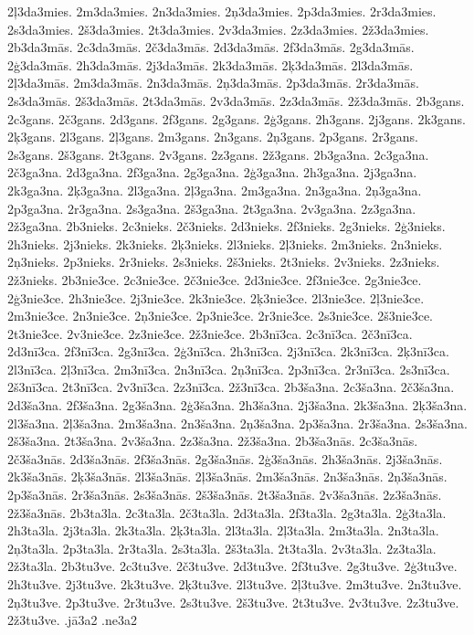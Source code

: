 {2ļ3da3mies.
2m3da3mies.
2n3da3mies.
2ņ3da3mies.
2p3da3mies.
2r3da3mies.
2s3da3mies.
2š3da3mies.
2t3da3mies.
2v3da3mies.
2z3da3mies.
2ž3da3mies.
2b3da3mās.
2c3da3mās.
2č3da3mās.
2d3da3mās.
2f3da3mās.
2g3da3mās.
2ģ3da3mās.
2h3da3mās.
2j3da3mās.
2k3da3mās.
2ķ3da3mās.
2l3da3mās.
2ļ3da3mās.
2m3da3mās.
2n3da3mās.
2ņ3da3mās.
2p3da3mās.
2r3da3mās.
2s3da3mās.
2š3da3mās.
2t3da3mās.
2v3da3mās.
2z3da3mās.
2ž3da3mās.
2b3gans.
2c3gans.
2č3gans.
2d3gans.
2f3gans.
2g3gans.
2ģ3gans.
2h3gans.
2j3gans.
2k3gans.
2ķ3gans.
2l3gans.
2ļ3gans.
2m3gans.
2n3gans.
2ņ3gans.
2p3gans.
2r3gans.
2s3gans.
2š3gans.
2t3gans.
2v3gans.
2z3gans.
2ž3gans.
2b3ga3na.
2c3ga3na.
2č3ga3na.
2d3ga3na.
2f3ga3na.
2g3ga3na.
2ģ3ga3na.
2h3ga3na.
2j3ga3na.
2k3ga3na.
2ķ3ga3na.
2l3ga3na.
2ļ3ga3na.
2m3ga3na.
2n3ga3na.
2ņ3ga3na.
2p3ga3na.
2r3ga3na.
2s3ga3na.
2š3ga3na.
2t3ga3na.
2v3ga3na.
2z3ga3na.
2ž3ga3na.
2b3nieks.
2c3nieks.
2č3nieks.
2d3nieks.
2f3nieks.
2g3nieks.
2ģ3nieks.
2h3nieks.
2j3nieks.
2k3nieks.
2ķ3nieks.
2l3nieks.
2ļ3nieks.
2m3nieks.
2n3nieks.
2ņ3nieks.
2p3nieks.
2r3nieks.
2s3nieks.
2š3nieks.
2t3nieks.
2v3nieks.
2z3nieks.
2ž3nieks.
2b3nie3ce.
2c3nie3ce.
2č3nie3ce.
2d3nie3ce.
2f3nie3ce.
2g3nie3ce.
2ģ3nie3ce.
2h3nie3ce.
2j3nie3ce.
2k3nie3ce.
2ķ3nie3ce.
2l3nie3ce.
2ļ3nie3ce.
2m3nie3ce.
2n3nie3ce.
2ņ3nie3ce.
2p3nie3ce.
2r3nie3ce.
2s3nie3ce.
2š3nie3ce.
2t3nie3ce.
2v3nie3ce.
2z3nie3ce.
2ž3nie3ce.
2b3nī3ca.
2c3nī3ca.
2č3nī3ca.
2d3nī3ca.
2f3nī3ca.
2g3nī3ca.
2ģ3nī3ca.
2h3nī3ca.
2j3nī3ca.
2k3nī3ca.
2ķ3nī3ca.
2l3nī3ca.
2ļ3nī3ca.
2m3nī3ca.
2n3nī3ca.
2ņ3nī3ca.
2p3nī3ca.
2r3nī3ca.
2s3nī3ca.
2š3nī3ca.
2t3nī3ca.
2v3nī3ca.
2z3nī3ca.
2ž3nī3ca.
2b3ša3na.
2c3ša3na.
2č3ša3na.
2d3ša3na.
2f3ša3na.
2g3ša3na.
2ģ3ša3na.
2h3ša3na.
2j3ša3na.
2k3ša3na.
2ķ3ša3na.
2l3ša3na.
2ļ3ša3na.
2m3ša3na.
2n3ša3na.
2ņ3ša3na.
2p3ša3na.
2r3ša3na.
2s3ša3na.
2š3ša3na.
2t3ša3na.
2v3ša3na.
2z3ša3na.
2ž3ša3na.
2b3ša3nās.
2c3ša3nās.
2č3ša3nās.
2d3ša3nās.
2f3ša3nās.
2g3ša3nās.
2ģ3ša3nās.
2h3ša3nās.
2j3ša3nās.
2k3ša3nās.
2ķ3ša3nās.
2l3ša3nās.
2ļ3ša3nās.
2m3ša3nās.
2n3ša3nās.
2ņ3ša3nās.
2p3ša3nās.
2r3ša3nās.
2s3ša3nās.
2š3ša3nās.
2t3ša3nās.
2v3ša3nās.
2z3ša3nās.
2ž3ša3nās.
2b3ta3la.
2c3ta3la.
2č3ta3la.
2d3ta3la.
2f3ta3la.
2g3ta3la.
2ģ3ta3la.
2h3ta3la.
2j3ta3la.
2k3ta3la.
2ķ3ta3la.
2l3ta3la.
2ļ3ta3la.
2m3ta3la.
2n3ta3la.
2ņ3ta3la.
2p3ta3la.
2r3ta3la.
2s3ta3la.
2š3ta3la.
2t3ta3la.
2v3ta3la.
2z3ta3la.
2ž3ta3la.
2b3tu3ve.
2c3tu3ve.
2č3tu3ve.
2d3tu3ve.
2f3tu3ve.
2g3tu3ve.
2ģ3tu3ve.
2h3tu3ve.
2j3tu3ve.
2k3tu3ve.
2ķ3tu3ve.
2l3tu3ve.
2ļ3tu3ve.
2m3tu3ve.
2n3tu3ve.
2ņ3tu3ve.
2p3tu3ve.
2r3tu3ve.
2s3tu3ve.
2š3tu3ve.
2t3tu3ve.
2v3tu3ve.
2z3tu3ve.
2ž3tu3ve.
.jā3a2
.ne3a2
}
